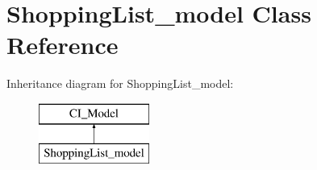 \hypertarget{class_shopping_list__model}{}\section{Shopping\+List\+\_\+model Class Reference}
\label{class_shopping_list__model}
Inheritance diagram for Shopping\+List\+\_\+model\+:\begin{figure}[H]
\begin{center}
\leavevmode
\includegraphics[height=2.000000cm]{class_shopping_list__model}
\end{center}
\end{figure}
